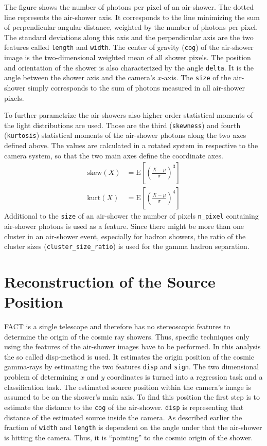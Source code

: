 %
The figure shows the number of photons per pixel of an air-shower. The dotted
line represents the air-shower axis. It corresponds to the line minimizing the
sum of perpendicular angular distance, weighted by the number of photons per
pixel. The standard deviations along this axis and the perpendicular axis are
the two features called \texttt{length} and \texttt{width}. The center of
gravity (\texttt{cog}) of the air-shower image is the two-dimensional weighted
mean of all shower pixels. The position and orientation of the shower is also
characterized by the angle \texttt{delta}. It is the angle between the shower
axis and the camera's $x$-axis. The \texttt{size} of the air-shower simply
corresponds to the sum of photons measured in all air-shower pixels.

To further parametrize the air-showers also higher order statistical moments of
the light distributions are used. Those are the third (\texttt{skewness}) and
fourth (\texttt{kurtosis}) statistical moments of the air-shower photons along
the two axes defined above. The values are calculated in a rotated system in
respective to the camera system, so that the two main axes define the
coordinate axes.
%
\begin{align}
  \text{skew}(X) &= \text{E}\left[\left(\frac{X-\mu}{\sigma}\right)^3\right] \label{eq:skew} \\
  \text{kurt}(X) &= \text{E}\left[\left(\frac{X-\mu}{\sigma}\right)^4\right]  \label{eq:kurt}
\end{align}
%
Additional to the \texttt{size} of an air-shower the number of pixels
\texttt{n\_pixel} containing air-shower photons is used as a feature. Since
there might be more than one cluster in an air-shower event, especially for
hadron showers, the ratio of the cluster sizes (\texttt{cluster\_size\_ratio})
is used for the gamma hadron separation.
%
\section{Reconstruction of the Source Position}
\label{sec:source_pos}%
%
FACT is a single telescope and therefore has no stereoscopic features to
determine the origin of the cosmic ray showers. Thus, specific techniques only
using the features of the air-shower images have to be performed. In this
analysis the so called disp-method is used. It estimates the origin position of
the cosmic gamma-rays by estimating the two features \texttt{disp} and \texttt{sign}. The two
dimensional problem of determining $x$ and $y$ coordinates is turned into a
regression task and a classification task. The estimated source position within
the camera's image is assumed to be on the shower's main axis. To find this
position the first step is to estimate the distance to the \texttt{cog} of the
air-shower. \texttt{disp} is representing that distance of the estimated source inside
the camera. As described earlier the fraction of \texttt{width} and \texttt{length} is dependent
on the angle under that the air-shower is hitting the camera. Thus, it is
\enquote{pointing} to the cosmic origin of the shower.

